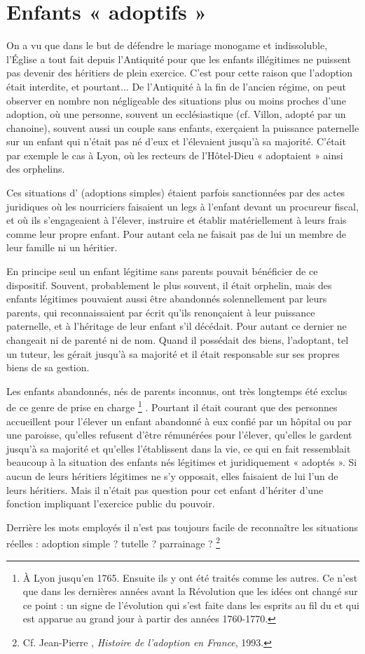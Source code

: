 \section{Enfants « adoptifs »}

 On a vu que dans le but de défendre le mariage monogame et indissoluble, l'Église a tout fait depuis l'Antiquité pour que les enfants illégitimes ne puissent pas devenir des héritiers de plein exercice. C'est pour cette raison que l'adoption était interdite, et pourtant... De l'Antiquité à la fin de l'ancien régime, on peut observer en nombre non négligeable des situations plus ou moins proches d'une adoption, où une personne, souvent un ecclésiastique (cf. \hbox{Villon}, adopté par un chanoine), souvent aussi un couple sans enfants, exerçaient la puissance paternelle sur un enfant qui n'était pas né d'eux et l'élevaient jusqu'à sa majorité. C'était par exemple le cas à Lyon, où les recteurs de l'Hôtel-Dieu « adoptaient » ainsi des orphelins. 

 Ces situations d' (adoptions simples) étaient parfois sanctionnées par des actes juridiques où les nourriciers faisaient un legs à l'enfant devant un procureur fiscal, et où ils s'engageaient à l'élever, instruire et établir matériellement à leurs frais comme leur propre enfant. Pour autant cela ne faisait pas de lui un membre de leur famille ni un héritier. 

 En principe seul un enfant légitime sans parents pouvait bénéficier de ce dispositif. Souvent, probablement le plus souvent, il était orphelin, mais des enfants légitimes pouvaient aussi être abandonnés solennellement par leurs parents, qui reconnaissaient par écrit qu'ils renonçaient à leur puissance paternelle, et à l'héritage de leur enfant s'il décédait. Pour autant ce dernier ne changeait ni de parenté ni de nom. Quand il possédait des biens, l'adoptant, tel un tuteur, les gérait jusqu'à sa majorité et il était responsable sur ses propres biens de sa gestion. 

 Les enfants abandonnés, nés de parents inconnus, ont très longtemps été exclus de ce genre de prise en charge%
\footnote{À Lyon jusqu'en 1765. Ensuite ils y ont été traités comme les autres. Ce n'est que dans les dernières années avant la Révolution que les idées ont changé sur ce point : un signe de l'évolution qui s'est faite dans les esprits au fil du  et qui est apparue au grand jour à partir des années 1760-1770.}%
. Pourtant il était courant que des personnes accueillent pour l'élever un enfant abandonné à eux confié par un hôpital ou par une paroisse, qu'elles refusent d'être rémunérées pour l'élever, qu'elles le gardent jusqu'à sa majorité et qu'elles l'établissent dans la vie, ce qui en fait ressemblait beaucoup à la situation des enfants nés légitimes et juridiquement « adoptés ». Si aucun de leurs héritiers légitimes ne s'y opposait, elles faisaient de lui l'un de leurs héritiers. Mais il n'était pas question pour cet enfant d'hériter d'une fonction impliquant l'exercice public du pouvoir. 

 Derrière les mots employés il n'est pas toujours facile de reconnaître les situations réelles : adoption simple ? tutelle ? parrainage ?%
\footnote{Cf. Jean-Pierre , \emph{Histoire de l'adoption en France}, 1993.} 


